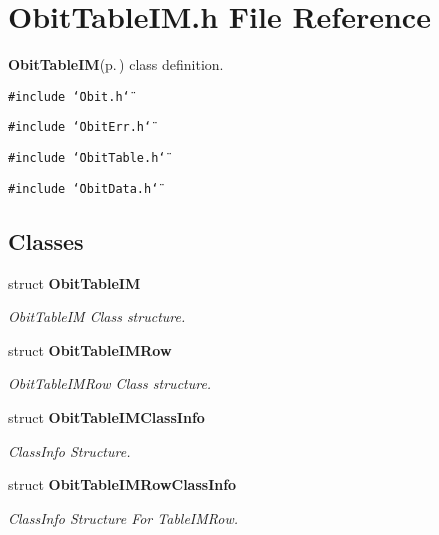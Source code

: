 \section{Obit\-Table\-IM.h File Reference}
\label{ObitTableIM_8h}
{\bf Obit\-Table\-IM}{\rm (p.\,\pageref{structObitTableIM})} class definition. 

{\tt \#include \char`\"{}Obit.h\char`\"{}}\par
{\tt \#include \char`\"{}Obit\-Err.h\char`\"{}}\par
{\tt \#include \char`\"{}Obit\-Table.h\char`\"{}}\par
{\tt \#include \char`\"{}Obit\-Data.h\char`\"{}}\par
\subsection*{Classes}
\begin{CompactItemize}
\item 
struct {\bf Obit\-Table\-IM}
\begin{CompactList}\small\item\em Obit\-Table\-IM Class structure. \item\end{CompactList}\item 
struct {\bf Obit\-Table\-IMRow}
\begin{CompactList}\small\item\em Obit\-Table\-IMRow Class structure. \item\end{CompactList}\item 
struct {\bf Obit\-Table\-IMClass\-Info}
\begin{CompactList}\small\item\em Class\-Info Structure. \item\end{CompactList}\item 
struct {\bf Obit\-Table\-IMRow\-Class\-Info}
\begin{CompactList}\small\item\em Class\-Info Structure For Table\-IMRow. \item\end{CompactList}\end{CompactItemize}
